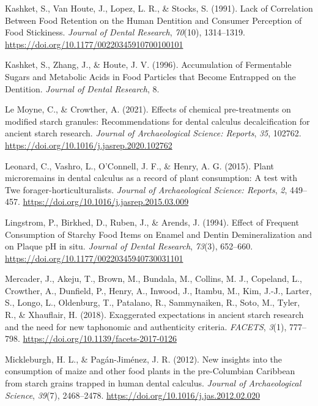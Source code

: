 \documentclass[
  b5paper,
]{book}
\newlength{\cslhangindent}
\newenvironment{CSLReferences}[2] %
 {\begin{list}{}{%
  \setlength{\itemindent}{0pt}
  \setlength{\leftmargin}{0pt}
  \setlength{\parsep}{0pt}
  \ifodd #1
   \setlength{\leftmargin}{\cslhangindent}
   \setlength{\itemindent}{-1\cslhangindent}
  \fi
  \setlength{\itemsep}{#2\baselineskip}}}
 {\end{list}}
\begin{document}
\begin{CSLReferences}{1}{0}
Kashket, S., Van Houte, J., Lopez, L. R., \& Stocks, S. (1991). Lack of
{Correlation Between Food Retention} on the {Human Dentition} and
{Consumer Perception} of {Food Stickiness}. \emph{Journal of Dental
Research}, \emph{70}(10), 1314--1319.
\url{https://doi.org/10.1177/00220345910700100101}

Kashket, S., Zhang, J., \& Houte, J. V. (1996). Accumulation of
{Fermentable Sugars} and {Metabolic Acids} in {Food Particles} that
{Become Entrapped} on the {Dentition}. \emph{Journal of Dental
Research}, 8.

Le Moyne, C., \& Crowther, A. (2021). Effects of chemical pre-treatments
on modified starch granules: {Recommendations} for dental calculus
decalcification for ancient starch research. \emph{Journal of
Archaeological Science: Reports}, \emph{35}, 102762.
\url{https://doi.org/10.1016/j.jasrep.2020.102762}

Leonard, C., Vashro, L., O'Connell, J. F., \& Henry, A. G. (2015). Plant
microremains in dental calculus as a record of plant consumption: {A}
test with {Twe} forager-horticulturalists. \emph{Journal of
Archaeological Science: Reports}, \emph{2}, 449--457.
\url{https://doi.org/10.1016/j.jasrep.2015.03.009}

Lingstrom, P., Birkhed, D., Ruben, J., \& Arends, J. (1994). Effect of
{Frequent Consumption} of {Starchy Food Items} on {Enamel} and {Dentin
Demineralization} and on {Plaque pH} in situ. \emph{Journal of Dental
Research}, \emph{73}(3), 652--660.
\url{https://doi.org/10.1177/00220345940730031101}

Mercader, J., Akeju, T., Brown, M., Bundala, M., Collins, M. J.,
Copeland, L., Crowther, A., Dunfield, P., Henry, A., Inwood, J., Itambu,
M., Kim, J.-J., Larter, S., Longo, L., Oldenburg, T., Patalano, R.,
Sammynaiken, R., Soto, M., Tyler, R., \& Xhauflair, H. (2018).
Exaggerated expectations in ancient starch research and the need for new
taphonomic and authenticity criteria. \emph{FACETS}, \emph{3}(1),
777--798. \url{https://doi.org/10.1139/facets-2017-0126}

Mickleburgh, H. L., \& Pagán-Jiménez, J. R. (2012). New insights into
the consumption of maize and other food plants in the pre-{Columbian
Caribbean} from starch grains trapped in human dental calculus.
\emph{Journal of Archaeological Science}, \emph{39}(7), 2468--2478.
\url{https://doi.org/10.1016/j.jas.2012.02.020}


\end{CSLReferences}
\end{document}
